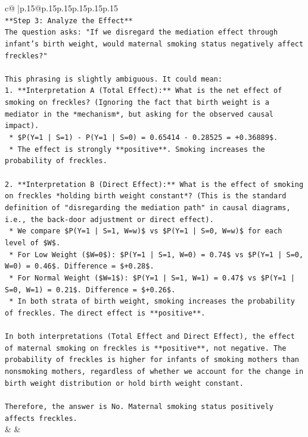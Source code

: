\documentclass{article}
\begin{document}
{\begin{supertabular}{c@{$\;$}|p{.15\linewidth}@{}p{.15\linewidth}p{.15\linewidth}p{.15\linewidth}p{.15\linewidth}p{.15\linewidth}}
{{{\\ 
\texttt{**Step 3: Analyze the Effect**} \\
\texttt{The question asks: "If we disregard the mediation effect through infant's birth weight, would maternal smoking status negatively affect freckles?"} \\
\\ 
\texttt{This phrasing is slightly ambiguous. It could mean:} \\
\texttt{1.  **Interpretation A (Total Effect):** What is the net effect of smoking on freckles? (Ignoring the fact that birth weight is a mediator in the *mechanism*, but asking for the observed causal impact).} \\
\texttt{    *   \$P(Y=1 | S=1) {-} P(Y=1 | S=0) = 0.65414 {-} 0.28525 = +0.36889\$.} \\
\texttt{    *   The effect is strongly **positive**. Smoking increases the probability of freckles.} \\
\\ 
\texttt{2.  **Interpretation B (Direct Effect):** What is the effect of smoking on freckles *holding birth weight constant*? (This is the standard definition of "disregarding the mediation path" in causal diagrams, i.e., the back{-}door adjustment or direct effect).} \\
\texttt{    *   We compare \$P(Y=1 | S=1, W=w)\$ vs \$P(Y=1 | S=0, W=w)\$ for each level of \$W\$.} \\
\texttt{    *   For Low Weight (\$W=0\$): \$P(Y=1 | S=1, W=0) = 0.74\$ vs \$P(Y=1 | S=0, W=0) = 0.46\$. Difference = \$+0.28\$.} \\
\texttt{    *   For Normal Weight (\$W=1\$): \$P(Y=1 | S=1, W=1) = 0.47\$ vs \$P(Y=1 | S=0, W=1) = 0.21\$. Difference = \$+0.26\$.} \\
\texttt{    *   In both strata of birth weight, smoking increases the probability of freckles. The direct effect is **positive**.} \\
\\ 
\texttt{In both interpretations (Total Effect and Direct Effect), the effect of maternal smoking on freckles is **positive**, not negative. The probability of freckles is higher for infants of smoking mothers than nonsmoking mothers, regardless of whether we account for the change in birth weight distribution or hold birth weight constant.} \\
\\ 
\texttt{Therefore, the answer is No. Maternal smoking status positively affects freckles.} \\
            }
        }
    }
    & & \\ \\


\end{supertabular}}
\end{document}
